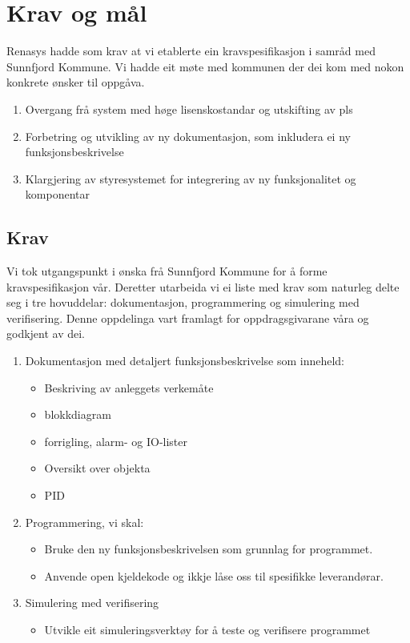 \chapter{Krav og mål}
\thispagestyle{fancy}
\gls{Renasys} hadde som krav at vi etablerte ein kravspesifikasjon i samråd med \gls{Sunnfjord Kommune}.
Vi hadde eit møte med kommunen der dei kom med nokon konkrete ønsker til oppgåva.

\begin{enumerate}
    \item Overgang frå system med høge lisenskostandar og utskifting av pls
    \item Forbetring og utvikling av ny dokumentasjon, som inkludera ei ny funksjonsbeskrivelse 
    \item Klargjering av styresystemet for integrering av ny funksjonalitet og komponentar
\end{enumerate}

\section{Krav}
Vi tok utgangspunkt i ønska frå \gls{Sunnfjord Kommune} for å forme kravspesifikasjon vår.
Deretter utarbeida vi ei liste med krav som naturleg delte seg i tre
hovuddelar: dokumentasjon, programmering og simulering med verifisering. Denne oppdelinga vart framlagt for oppdragsgivarane våra og godkjent av dei. 



\begin{enumerate}
    \item Dokumentasjon med detaljert funksjonsbeskrivelse som inneheld:
        \begin{itemize} 
        \item Beskriving av anleggets verkemåte
        \item \gls{blokkdiagram}
        \item \gls{forrigling}, \gls{alarm}- og \gls{IO}-lister
        \item Oversikt over objekta
        \item \gls{PID}
        \end{itemize}
    \item Programmering, vi skal:
        \begin{itemize}
        \item Bruke den ny funksjonsbeskrivelsen som grunnlag for programmet.
        \item Anvende open kjeldekode og ikkje låse oss til spesifikke leverandørar.
        \end{itemize}
    \item Simulering med verifisering
        \begin{itemize}
        \item Utvikle eit simuleringsverktøy for å teste og verifisere programmet
        \end{itemize}
\end{enumerate}

